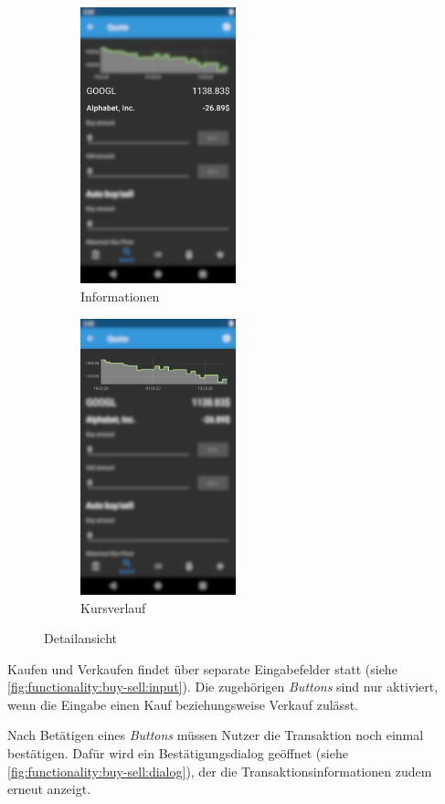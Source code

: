 \documentclass[a4paper]{article}
\begin{document}
\begin{figure}[H]
	\begin{subfigure}{.5\textwidth}
		\centering
		\includegraphics[height=8cm,keepaspectratio]{./images/quote/information.png}
		\caption{Informationen}
		\label{fig:functionality:quote:information}
	\end{subfigure}
	\begin{subfigure}{.5\textwidth}
		\centering
		\includegraphics[height=8cm,keepaspectratio]{./images/quote/history.png}
		\caption{Kursverlauf}
		\label{fig:functionality:quote:history}
	\end{subfigure}
	\caption{Detailansicht}
	\label{fig:functionality:quote}
\end{figure}

Kaufen und Verkaufen findet über separate Eingabefelder statt (siehe \autoref{fig:functionality:buy-sell:input}).
Die zugehörigen \textit{Buttons} sind nur aktiviert, wenn die Eingabe einen Kauf beziehungsweise Verkauf zulässt.

Nach Betätigen eines \textit{Buttons} müssen Nutzer die Transaktion noch einmal bestätigen.
Dafür wird ein Bestätigungsdialog geöffnet (siehe \autoref{fig:functionality:buy-sell:dialog}), der die Transaktionsinformationen zudem erneut anzeigt.
\end{document}

